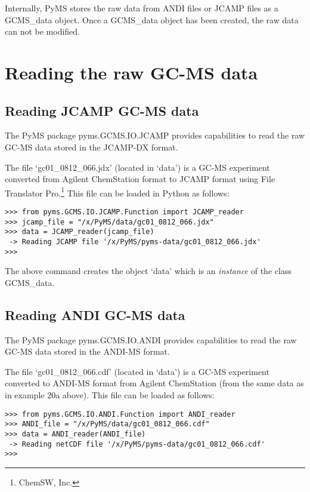 Internally, PyMS stores the raw data from ANDI files or JCAMP files as a
GCMS\_data object. Once a GCMS\_data object has been created, the raw data
can not be modified.

\section{Reading the raw GC-MS data}

\subsection{Reading JCAMP GC-MS data}


The PyMS package pyms.GCMS.IO.JCAMP provides capabilities to read the raw
GC-MS data stored in the JCAMP-DX format.

The file `gc01\_0812\_066.jdx' (located in `data') is a GC-MS experiment
converted from Agilent ChemStation format to JCAMP format using File
Translator Pro.\footnote{ChemSW, Inc.} This file can be loaded in Python
as follows:

\begin{verbatim}
>>> from pyms.GCMS.IO.JCAMP.Function import JCAMP_reader
>>> jcamp_file = "/x/PyMS/data/gc01_0812_066.jdx"
>>> data = JCAMP_reader(jcamp_file)
 -> Reading JCAMP file '/x/PyMS/pyms-data/gc01_0812_066.jdx'
>>>
\end{verbatim}

\noindent
The above command creates the object `data' which is an {\em instance}
of the class GCMS\_data.

\subsection{Reading ANDI GC-MS data}


The PyMS package pyms.GCMS.IO.ANDI provides capabilities to read the raw
GC-MS data stored in the ANDI-MS format.

The file `gc01\_0812\_066.cdf' (located in `data') is a GC-MS experiment
converted to ANDI-MS format from Agilent ChemStation (from the same data as in
example 20a above). This file can be loaded as follows:

\begin{verbatim}
>>> from pyms.GCMS.IO.ANDI.Function import ANDI_reader
>>> ANDI_file = "/x/PyMS/data/gc01_0812_066.cdf"
>>> data = ANDI_reader(ANDI_file)
 -> Reading netCDF file '/x/PyMS/pyms-data/gc01_0812_066.cdf'
>>>
\end{verbatim}

